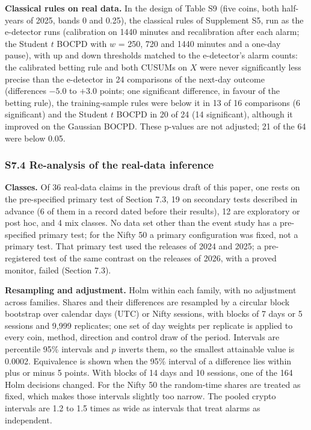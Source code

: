 \documentclass[
]{article}
\begin{document}
\textbf{Classical rules on real data.} In the design of Table S9 (five
coins, both half-years of 2025, bands 0 and 0.25), the classical rules
of Supplement S5, run as the e-detector runs (calibration on 1440
minutes and recalibration after each alarm; the Student \(t\) BOCPD with
\(w\) = 250, 720 and 1440 minutes and a one-day pause), with up and down
thresholds matched to the e-detector's alarm counts: the calibrated
betting rule and both CUSUMs on \(X\) were never significantly less
precise than the e-detector in 24 comparisons of the next-day outcome
(differences \(-5.0\) to \(+3.0\) points; one significant difference, in
favour of the betting rule), the training-sample rules were below it in
13 of 16 comparisons (6 significant) and the Student \(t\) BOCPD in 20
of 24 (14 significant), although it improved on the Gaussian BOCPD.
These p-values are not adjusted; 21 of the 64 were below 0.05.

\hypertarget{s7.4-re-analysis-of-the-real-data-inference}{%
\subsubsection{S7.4 Re-analysis of the real-data
inference}\label{s7.4-re-analysis-of-the-real-data-inference}}

\textbf{Classes.} Of 36 real-data claims in the previous draft of this
paper, one rests on the pre-specified primary test of Section 7.3, 19 on
secondary tests described in advance (6 of them in a record dated before
their results), 12 are exploratory or post hoc, and 4 mix classes. No
data set other than the event study has a pre-specified primary test;
for the Nifty 50 a primary configuration was fixed, not a primary test.
That primary test used the releases of 2024 and 2025; a pre-registered
test of the same contrast on the releases of 2026, with a proved
monitor, failed (Section 7.3).

\textbf{Resampling and adjustment.} Holm within each family, with no
adjustment across families. Shares and their differences are resampled
by a circular block bootstrap over calendar days (UTC) or Nifty
sessions, with blocks of 7 days or 5 sessions and 9,999 replicates; one
set of day weights per replicate is applied to every coin, method,
direction and control draw of the period. Intervals are percentile 95\%
intervals and \(p\) inverts them, so the smallest attainable value is
0.0002. Equivalence is shown when the 95\% interval of a difference lies
within plus or minus 5 points. With blocks of 14 days and 10 sessions,
one of the 164 Holm decisions changed. For the Nifty 50 the random-time
shares are treated as fixed, which makes those intervals slightly too
narrow. The pooled crypto intervals are 1.2 to 1.5 times as wide as
intervals that treat alarms as independent.
\end{document}
